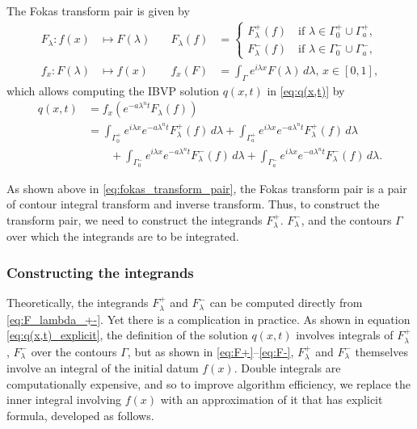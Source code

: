 \documentclass[12pt, oneside, a4paper]{article}
\begin{document}
The Fokas transform pair is given by
\begin{subequations}\label{eq:fokas_transform_pair}
    \begin{alignat}{3}
        F_\lambda: f(x)&\mapsto F(\lambda)\quad &F_\lambda(f) &= \begin{cases}F^+_\lambda(f)\quad\mbox{if $\lambda\in \Gamma_0^+\cup \Gamma_a^+$},\\F^-_\lambda(f)\quad\mbox{if $\lambda\in \Gamma_0^-\cup \Gamma_a^-$},\end{cases} \label{eq:F_lambda}\\
        f_x:F(\lambda)&\mapsto f(x)\quad &f_x(F) &= \int_\Gamma e^{i\lambda x} F(\lambda)\,d\lambda,\, x\in [0,1], \label{eq:f_x}
    \end{alignat}
\end{subequations}
which allows computing the IBVP solution $q(x,t)$ in \eqref{eq:q(x,t)} by
\begin{equation}\label{eq:q(x,t)_explicit}
    \begin{split}
        q(x,t) &= f_x\left(e^{-a\lambda^n t}F_\lambda(f)\right)\\
        &= \int_{\Gamma_0^+}e^{i\lambda x}e^{-a\lambda^n t}F_\lambda^+(f)\,d\lambda + \int_{\Gamma_a^+}e^{i\lambda x}e^{-a\lambda^n t}F_\lambda^+(f)\,d\lambda\\
        &\qquad + \int_{\Gamma_0^-}e^{i\lambda x}e^{-a\lambda^n t}F_\lambda^-(f)\,d\lambda + \int_{\Gamma_a^-}e^{i\lambda x}e^{-a\lambda^n t}F_\lambda^-(f)\,d\lambda.
    \end{split}
\end{equation}

As shown above in \eqref{eq:fokas_transform_pair}, the Fokas transform pair is a pair of contour integral transform and inverse transform. Thus, to construct the transform pair, we need to construct the integrands $F^+_\lambda$. $F^-_\lambda$, and the contours $\Gamma$ over which the integrands are to be integrated.

\subsubsection{Constructing the integrands}\label{sec:constructing_integrands}

Theoretically, the integrands $F^+_\lambda$ and $F^-_\lambda$ can be computed directly from \eqref{eq:F_lambda_+-}. Yet there is a complication in practice. As shown in equation \eqref{eq:q(x,t)_explicit}, the definition of the solution $q(x,t)$ involves integrals of $F_\lambda^+$, $F_\lambda^-$ over the contours $\Gamma$, but as shown in \eqref{eq:F+}--\eqref{eq:F-}, $F_\lambda^+$ and $F_\lambda^-$ themselves involve an integral of the initial datum $f(x)$. Double integrals are computationally expensive, and so to improve algorithm efficiency, we replace the inner integral involving $f(x)$ with an approximation of it that has explicit formula, developed as follows.
\end{document}
